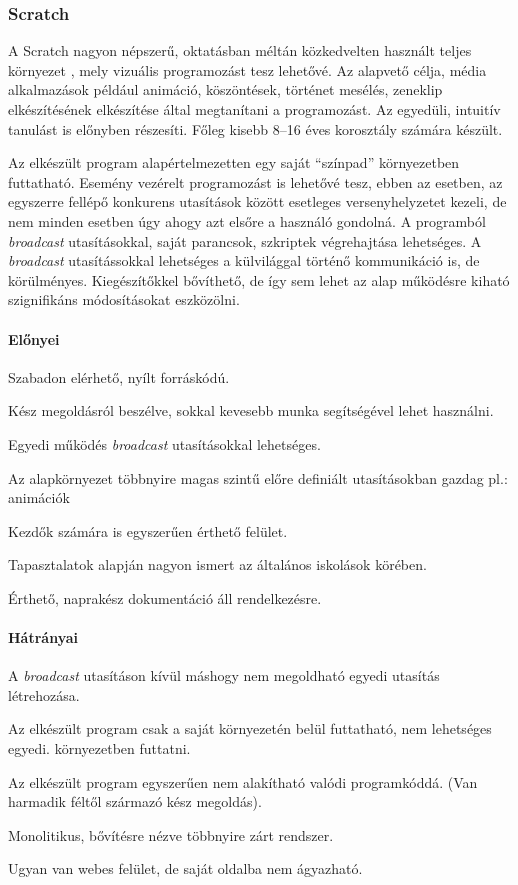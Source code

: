 \documentclass[12pt,a4paper,oneside]{report} %
\begin{document}
\subsubsection{Scratch} 
\label{scratch}
A Scratch nagyon népszerű, oktatásban méltán közkedvelten használt teljes környezet \cite{maloney2010scratch, resnick2009scratch, ScratchUrl2019Jan}, mely vizuális programozást tesz lehetővé. Az alapvető célja, média alkalmazások például animáció, köszöntések, történet mesélés, zeneklip elkészítésének elkészítése által megtanítani a programozást. Az egyedüli, intuitív tanulást is előnyben részesíti. Főleg kisebb 8--16 éves korosztály számára készült. 
\par Az elkészült program alapértelmezetten egy saját ``{színpad}'' környezetben futtatható. Esemény vezérelt programozást is lehetővé tesz, ebben az esetben, az egyszerre fellépő konkurens utasítások között esetleges versenyhelyzetet kezeli, de nem minden esetben úgy ahogy azt elsőre a használó gondolná.  A programból \textit{broadcast} utasításokkal, saját parancsok, szkriptek végrehajtása lehetséges. A \textit{broadcast} utasítássokkal lehetséges a külvilággal történő kommunikáció is, de körülményes. Kiegészítőkkel bővíthető, de így sem lehet az alap működésre kiható szignifikáns módosításokat eszközölni.
\paragraph{Előnyei} 
\begin{compactitem}
	\item Szabadon elérhető, nyílt forráskódú.
	\item Kész megoldásról beszélve, sokkal kevesebb munka segítségével lehet használni.
	\item Egyedi működés \textit{broadcast} utasításokkal lehetséges.
	\item Az alapkörnyezet többnyire magas szintű előre definiált utasításokban gazdag pl.: animációk
	\item Kezdők számára is egyszerűen érthető felület.
	\item Tapasztalatok alapján nagyon ismert az általános iskolások körében.
	\item Érthető, naprakész dokumentáció áll rendelkezésre.
\end{compactitem}
\paragraph{Hátrányai} 
\begin{compactitem}
	\item A \textit{broadcast} utasításon kívül máshogy nem megoldható egyedi utasítás létrehozása.
	\item Az elkészült program csak a saját környezetén belül futtatható, nem lehetséges egyedi. környezetben futtatni.
	\item Az elkészült program egyszerűen nem alakítható valódi programkóddá. (Van harmadik féltől származó kész megoldás).
	\item Monolitikus, bővítésre nézve többnyire zárt rendszer.
	\item Ugyan van webes felület, de saját oldalba nem ágyazható.
\end{compactitem}
\end{document}
